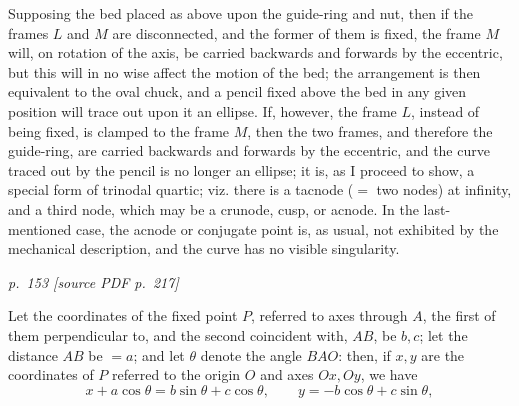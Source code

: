 \documentclass[11pt,a4paper]{article}
\newcommand{\sourcepage}[2]{%
  \bigskip
  \noindent\textit{p.~#1 [source PDF p.~#2]}%
  \par\smallskip
}
\begin{document}
Supposing the bed placed as above upon the guide-ring and nut, then if the frames
\(L\) and \(M\) are disconnected, and the former of them is fixed, the frame \(M\)
will, on rotation of the axis, be carried backwards and forwards by the eccentric, but
this will in no wise affect the motion of the bed; the arrangement is then equivalent
to the oval chuck, and a pencil fixed above the bed in any given position will trace
out upon it an ellipse. If, however, the frame \(L\), instead of being fixed, is clamped
to the frame \(M\), then the two frames, and therefore the guide-ring, are carried
backwards and forwards by the eccentric, and the curve traced out by the pencil is
no longer an ellipse; it is, as I proceed to show, a special form of trinodal quartic;
viz. there is a tacnode (\(=\) two nodes) at infinity, and a third node, which may be
a crunode, cusp, or acnode. In the last-mentioned case, the acnode or conjugate point
is, as usual, not exhibited by the mechanical description, and the curve has no visible
singularity.

\sourcepage{153}{217}

Let the coordinates of the fixed point \(P\), referred to axes through \(A\), the first
of them perpendicular to, and the second coincident with, \(AB\), be \(b,c\); let the
distance \(AB\) be \(=a\); and let \(\theta\) denote the angle \(BAO\): then, if \(x,y\)
are the coordinates of \(P\) referred to the origin \(O\) and axes \(Ox,Oy\), we have
\[
x+a\cos\theta=b\sin\theta+c\cos\theta,\qquad
y=-b\cos\theta+c\sin\theta,
\]

\begin{center}
\end{center}
\end{document}
